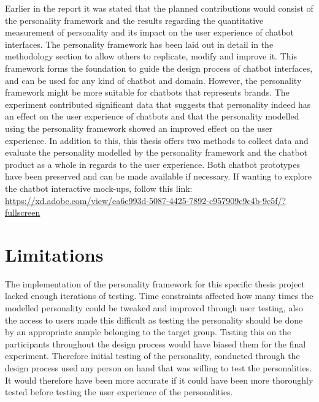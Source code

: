 Earlier in the report it was stated that the planned contributions would consist of the personality framework and the results regarding the quantitative measurement of personality and its impact on the user experience of chatbot interfaces. The personality framework has been laid out in detail in the methodology section to allow others to replicate, modify and improve it. This framework forms the foundation to guide the design process of chatbot interfaces, and can be used for any kind of chatbot and domain. However, the personality framework might be more suitable for chatbots that represents brands. The experiment contributed significant data that suggests that personality indeed has an effect on the user experience of chatbots and that the personality modelled using the personality framework showed an improved effect on the user experience. In addition to this, this thesis offers two methods to collect data and evaluate the personality modelled by the personality framework and the chatbot product as a whole in regards to the user experience. Both chatbot prototypes have been preserved and can be made available if necessary. If wanting to explore the chatbot interactive mock-ups, follow this link: \url{https://xd.adobe.com/view/ea6e993d-5087-4425-7892-c957909c9c4b-9c5f/?fullscreen}

\vspace{5mm}

\section{Limitations}

The implementation of the personality framework for this specific thesis project lacked enough iterations of testing. Time constraints affected how many times the modelled personality could be tweaked and improved through user testing, also the access to users made this difficult as testing the personality should be done by an appropriate sample belonging to the target group. Testing this on the participants throughout the design process would have biased them for the final experiment. Therefore initial testing of the personality, conducted through the design process used any person on hand that was willing to test the personalities. It would therefore have been more accurate if it could have been more thoroughly tested before testing the user experience of the personalities.

